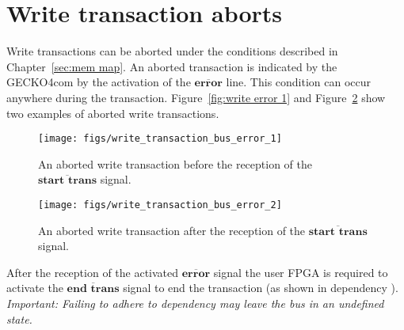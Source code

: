 \section{Write transaction aborts}
Write transactions can be aborted under the conditions described in
Chapter~\ref{sec:mem map}. An aborted transaction is indicated by the {\sc
GECKO4com} by the activation of the $\overline{\textbf{error}}$ line. This
condition can occur anywhere during the transaction. Figure~\ref{fig:write
error 1} and Figure~\ref{fig:write error 2} show two examples of aborted write
transactions.
\begin{figure}[pt]
\centering%
\texttt{[image: figs/write\_transaction\_bus\_error\_1]}
\caption{An aborted write transaction before the reception of the
$\overline{\textbf{start trans}}$ signal.}
\label{fig:write error 1}
\end{figure}
\begin{figure}[pb]
\centering%
\texttt{[image: figs/write\_transaction\_bus\_error\_2]}
\caption{An aborted write transaction after the reception of the
$\overline{\textbf{start trans}}$ signal.}
\label{fig:write error 2}
\end{figure}
After the reception of the activated $\overline{\textbf{error}}$ signal the user
FPGA is required to activate the $\overline{\textbf{end trans}}$ signal to end
the transaction (as shown in dependency ).\\
\textit{Important: Failing to adhere to dependency  may leave the bus
in an undefined state.\important}
